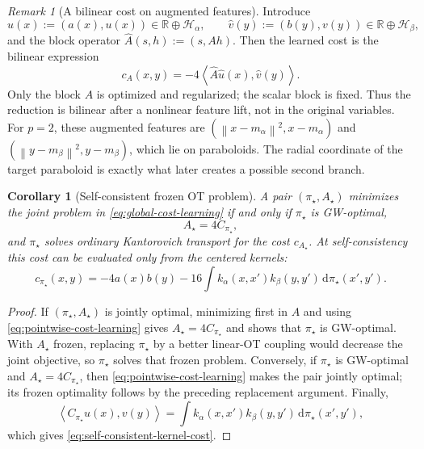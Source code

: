 \documentclass[11pt,a4paper]{article}
\newtheorem{corollary}[theorem]{Corollary}
\theoremstyle{definition}
\theoremstyle{remark}
\newtheorem{remark}[theorem]{Remark}
\newcommand{\R}{\mathbb R}
\newcommand{\Hcal}{\mathcal H}
\newcommand{\dd}{\,\mathrm d}
\newcommand{\norm}[1]{\left\lVert #1\right\rVert}
\newcommand{\ip}[2]{\left\langle #1,#2\right\rangle}
\begin{document}
\begin{remark}[A bilinear cost on augmented features]
\label{rem:augmented-feature-cost}
Introduce
\[
  \widehat u(x):=(a(x),u(x))\in\R\oplus\Hcal_\alpha,
  \qquad
  \widehat v(y):=(b(y),v(y))\in\R\oplus\Hcal_\beta,
\]
and the block operator
\(
 \widehat A(s,h):=(s,Ah).
\)
Then the learned cost is the bilinear expression
\begin{equation}
  c_A(x,y)=-4\ip{\widehat A\widehat u(x)}{\widehat v(y)}.
  \label{eq:augmented-bilinear-cost}
\end{equation}
Only the block \(A\) is optimized and regularized; the scalar block is fixed.
Thus the reduction is bilinear after a nonlinear feature lift, not in the
original variables.  For \(p=2\), these augmented features are
\(
 (\norm{x-m_\alpha}^2,x-m_\alpha)
\)
and
\(
 (\norm{y-m_\beta}^2,y-m_\beta)
\),
which lie on paraboloids.  The radial coordinate of the target paraboloid is
exactly what later creates a possible second branch.
\end{remark}

\begin{corollary}[Self-consistent frozen OT problem]
\label{cor:self-consistent-linear-ot}
A pair \((\pi_\star,A_\star)\) minimizes the joint problem in
\eqref{eq:global-cost-learning} if and only if \(\pi_\star\) is GW-optimal,
\begin{equation}
  A_\star=4C_{\pi_\star},
  \label{eq:self-consistent-operator}
\end{equation}
and \(\pi_\star\) solves ordinary Kantorovich transport for the cost
\(c_{A_\star}\).  At self-consistency this cost can be evaluated only from
the centered kernels:
\begin{equation}
  c_{\pi_\star}(x,y)
  =-4a(x)b(y)
   -16\int k_\alpha(x,x')k_\beta(y,y')
     \dd\pi_\star(x',y').
  \label{eq:self-consistent-kernel-cost}
\end{equation}
\end{corollary}

\begin{proof}
If \((\pi_\star,A_\star)\) is jointly optimal, minimizing first in \(A\) and
using \eqref{eq:pointwise-cost-learning} gives
\(A_\star=4C_{\pi_\star}\) and shows that \(\pi_\star\) is GW-optimal.  With
\(A_\star\) frozen, replacing \(\pi_\star\) by a better linear-OT coupling
would decrease the joint objective, so \(\pi_\star\) solves that frozen
problem.  Conversely, if \(\pi_\star\) is GW-optimal and
\(A_\star=4C_{\pi_\star}\), then \eqref{eq:pointwise-cost-learning} makes the
pair jointly optimal; its frozen optimality follows by the preceding
replacement argument.  Finally,
\[
  \ip{C_{\pi_\star}u(x)}{v(y)}
  =\int k_\alpha(x,x')k_\beta(y,y')\dd\pi_\star(x',y'),
\]
which gives \eqref{eq:self-consistent-kernel-cost}.
\end{proof}
\end{document}
